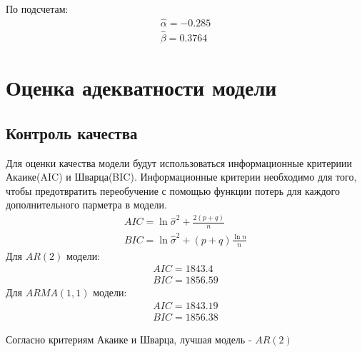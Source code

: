 \documentclass{article}
\begin{document}
По подсчетам: 
\begin{gather*}
    \hat{\alpha} = -0.285\\
    \hat{\beta} = 0.3764
\end{gather*}\newpage

\section{Оценка адекватности модели}
\subsection{Контроль качества}

Для оценки качества модели будут использоваться информационные критериии Акаике(AIC) и Шварца(BIC). Информационные критерии необходимо для того, чтобы предотвратить переобучение с помощью функции потерь для каждого дополнительного парметра в модели.\newline
\begin{gather*}
    AIC = \ln\hat{\sigma}^2+\frac{2(p+q)}{n}\\
    BIC = \ln\hat{\sigma}^2 + (p+q)\frac{\ln n}{n}
\end{gather*}
Для $AR(2)$ модели:
\begin{gather*}
    AIC=1843.4 \\ BIC=1856.59
\end{gather*}
Для $ARMA(1,1)$ модели:
\begin{gather*}
    AIC=1843.19 \\ BIC=1856.38
\end{gather*}

Согласно критериям Акаике и Шварца, лучшая модель - $AR(2)$
\end{document}
